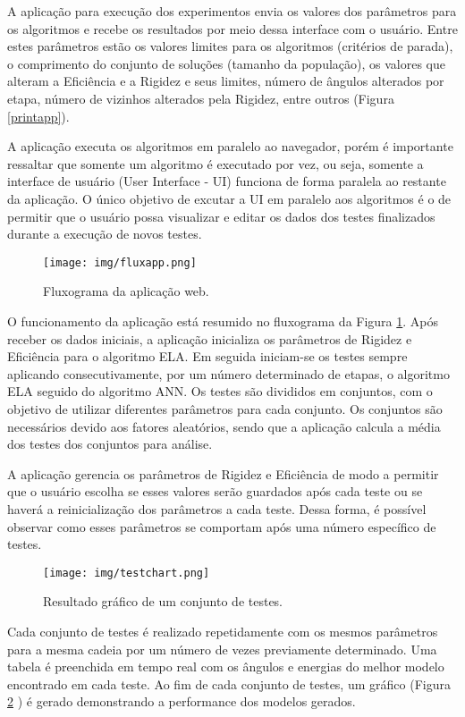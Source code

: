 \documentclass[dm,ppgcomp]{texfurg}
\begin{document}
A aplicação para execução dos experimentos envia os valores dos parâmetros para os algoritmos e recebe os resultados por meio dessa interface com o usuário. Entre estes parâmetros estão os valores limites para os algoritmos (critérios de parada), o comprimento do conjunto de soluções (tamanho da população), os valores que alteram a Eficiência e a Rigidez e seus limites, número de ângulos alterados por etapa, número de vizinhos alterados pela Rigidez, entre outros (Figura \ref{printapp}).

A aplicação executa os algoritmos em paralelo ao navegador, porém é importante ressaltar que somente um algoritmo é executado por vez, ou seja, somente a interface de usuário (User Interface - UI) funciona de forma paralela ao restante da aplicação. O único objetivo de excutar a UI em paralelo aos algoritmos é o de permitir que o usuário possa visualizar e editar os dados dos testes finalizados durante a execução de novos testes.

\begin{figure}[htbp]
  \centering \texttt{[image: img/fluxapp.png]}
\caption{Fluxograma da aplicação web.} 
\label{fluxapp}
\end{figure}

O funcionamento da aplicação está resumido no fluxograma da Figura \ref{fluxapp}. Após receber os dados iniciais, a aplicação inicializa  os parâmetros de Rigidez e Eficiência para o algoritmo ELA. Em seguida iniciam-se os testes sempre aplicando consecutivamente, por um número determinado de etapas, o algoritmo ELA seguido do algoritmo ANN. Os testes são divididos em conjuntos, com o objetivo de utilizar diferentes parâmetros para cada conjunto. Os conjuntos são necessários devido aos fatores aleatórios, sendo que a aplicação calcula a média dos testes dos conjuntos para análise.

A aplicação gerencia os parâmetros de Rigidez e Eficiência de modo a permitir que o usuário escolha se esses valores serão guardados após cada teste ou se haverá a reinicialização dos parâmetros a cada teste. Dessa forma, é possível observar como esses parâmetros se comportam após uma número específico de testes. 

\begin{figure}[htbp]
  \centering \texttt{[image: img/testchart.png]}
\caption{Resultado gráfico de um conjunto de testes.} 
\label{testchart}
\end{figure}

Cada conjunto de testes é realizado repetidamente com os mesmos parâmetros para a mesma cadeia por um número de vezes previamente determinado. Uma tabela é preenchida em tempo real com os ângulos e energias do melhor modelo encontrado em cada teste. Ao fim de cada conjunto de testes, um gráfico (Figura \ref{testchart} ) é gerado demonstrando a performance dos modelos gerados.
\end{document}
